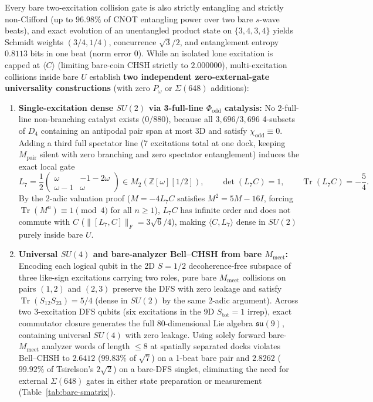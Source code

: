 Every bare two-excitation collision gate is also strictly entangling and strictly non-Clifford (up to $96.98\%$ of CNOT
entangling power over two bare $s$-wave beats), and exact  evolution of an unentangled product state on
$\{3,4,3,4\}$ yields Schmidt weights $(3/4, 1/4)$, concurrence $\sqrt{3}/2$, and entanglement entropy $0.8113$ bits in
one beat (norm error $0$). While an isolated lone excitation is capped at $\langle C \rangle$ (limiting bare-coin CHSH
strictly to $2.000000$), multi-excitation collisions inside bare $U$ establish \textbf{two independent zero-external-gate
universality constructions} (with zero $P_\omega$ or $\Sigma(648)$ additions):
\begin{enumerate}[itemsep=2pt]
\item \textbf{Single-excitation dense $SU(2)$ via 3-full-line $\Phi_{\mathrm{odd}}$ catalysis:} No 2-full-line
non-branching catalyst exists ($0/880$), because all $3{,}696/3{,}696$ 4-subsets of $D_4$ containing an antipodal pair
span at most 3D and satisfy $\chi_{\mathrm{odd}} \equiv 0$. Adding a third full spectator line (7 excitations total at
one dock, keeping $M_{\mathrm{pair}}$ silent with zero branching and zero spectator entanglement) induces the exact
 local gate
\begin{equation}
L_7 = \frac{1}{2}\begin{pmatrix} \omega & -1 - 2\omega \\ \omega - 1 & \omega \end{pmatrix} \in M_2(\mathbb{Z}[\omega][1/2]),
\qquad \det(L_7 C) = 1,
\qquad \operatorname{Tr}(L_7 C) = -\frac{5}{4}.
\label{eq:catalyst-l7}
\end{equation}
By the 2-adic valuation proof ($M = -4 L_7 C$ satisfies $M^2 = 5M - 16I$, forcing $\operatorname{Tr}(M^n) \equiv 1
\pmod 4$ for all $n \ge 1$), $L_7 C$ has infinite order and does not commute with $C$ ($\|[L_7, C]\|_F = 3\sqrt{6}/4$),
making $\langle C, L_7 \rangle$ dense in $SU(2)$ purely inside bare $U$.
\item \textbf{Universal $SU(4)$ and bare-analyzer Bell--CHSH from bare $M_{\mathrm{meet}}$:} Encoding each logical
qubit in the 2D $S = 1/2$ decoherence-free subspace of three like-sign excitations carrying two roles, pure bare
$M_{\mathrm{meet}}$ collisions on pairs $(1,2)$ and $(2,3)$ preserve the DFS with zero leakage and satisfy
$\operatorname{Tr}(S_{12} S_{23}) = 5/4$ (dense in $SU(2)$ by the same 2-adic argument). Across two 3-excitation DFS
qubits (six excitations in the 9D $S_{\mathrm{tot}} = 1$ irrep), exact commutator closure generates the full
80-dimensional Lie algebra $\mathfrak{su}(9)$, containing universal $SU(4)$ with zero leakage. Using solely forward
bare-$M_{\mathrm{meet}}$ analyzer words of length $\le 8$ at spatially separated docks violates Bell--CHSH to
$2.6412$ ($99.83\%$ of $\sqrt{7}$) on a 1-beat bare pair and $2.8262$ ($99.92\%$ of Tsirelson's $2\sqrt{2}$) on a
bare-DFS singlet, eliminating the need for external $\Sigma(648)$ gates in either state preparation or measurement
(Table~\ref{tab:bare-smatrix}).
\end{enumerate}

